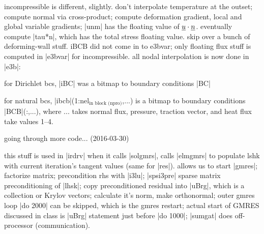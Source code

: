 \documentclass[11pt]{article}
\begin{document}
incompressible is different, slightly. don't interpolate temperature at the outset; compute normal via cross-product; compute deformation gradient, local and global variable gradients; |unm| has the floating value of $\underline{u} \cdot \underline{n}$. eventually compute |tau*n|, which has the total stress floating value. skip over a bunch of deforming-wall stuff. iBCB did not come in to e3bvar; only floating flux stuff is computed in |e3bvar| for incompressible. all nodal interpolation is now done in |e3b|:

for Dirichlet bcs, |iBC| was a bitmap to boundary conditions |BC|

for natural bcs, |ibcb|(1:nel$_\text{in block (npro)}$,...) is a bitmap to boundary conditions |BCB|(:,...), where ... takes normal flux, pressure, traction vector, and heat flux take values 1--4.

going through more code... (2016-03-30)

this stuff is used in |irdrv| when it calls |solgmrs|, calls |elmgmrs| to populate lshk with current iteration's tangent values (same for |res|). allows us to start |gmres|; factorize matrix; precondition rhs with |i3lu|; |spsi3pre| sparse matrix preconditioning of |lhsk|; copy preconditioned residual into |uBrg|, which is a collection or Krylov vectors; calculate it's norm, make orthonormal; outer gmres loop |do 2000| can be skipped, which is the gmres restart; actual start of GMRES discussed in class is |uBrg| statement just before |do 1000|; |sumgat| does off-processor (communication).
\end{document}
